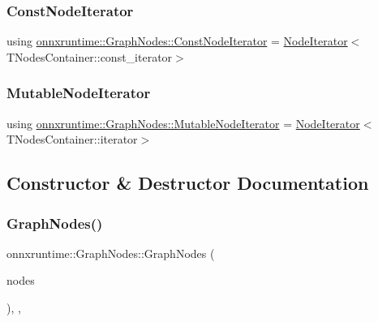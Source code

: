 \subsubsection{\texorpdfstring{Const\+Node\+Iterator}{ConstNodeIterator}}
{\footnotesize\ttfamily using \mbox{\hyperlink{classonnxruntime_1_1GraphNodes_a291880456b7298e7daededf91e494b6a}{onnxruntime\+::\+Graph\+Nodes\+::\+Const\+Node\+Iterator}} =  \mbox{\hyperlink{classonnxruntime_1_1GraphNodes_1_1NodeIterator}{Node\+Iterator}}$<$T\+Nodes\+Container\+::const\+\_\+iterator$>$}

\mbox{\label{classonnxruntime_1_1GraphNodes_ab5a670376171a0bc405018f0d6bb909d}} 
\subsubsection{\texorpdfstring{Mutable\+Node\+Iterator}{MutableNodeIterator}}
{\footnotesize\ttfamily using \mbox{\hyperlink{classonnxruntime_1_1GraphNodes_ab5a670376171a0bc405018f0d6bb909d}{onnxruntime\+::\+Graph\+Nodes\+::\+Mutable\+Node\+Iterator}} =  \mbox{\hyperlink{classonnxruntime_1_1GraphNodes_1_1NodeIterator}{Node\+Iterator}}$<$T\+Nodes\+Container\+::iterator$>$}



\subsection{Constructor \& Destructor Documentation}
\mbox{\label{classonnxruntime_1_1GraphNodes_a7222da2e71a88c370ecd61bbdfb6fa0b}} 
\subsubsection{\texorpdfstring{Graph\+Nodes()}{GraphNodes()}}
{\footnotesize\ttfamily onnxruntime\+::\+Graph\+Nodes\+::\+Graph\+Nodes (\begin{DoxyParamCaption}\item[{T\+Nodes\+Container \&}]{nodes }\end{DoxyParamCaption})\hspace{0.3cm}{\ttfamily [inline]}, {\ttfamily [explicit]}, {\ttfamily [noexcept]}}



